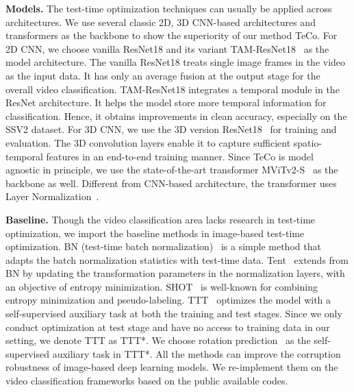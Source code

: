 \documentclass{article} %
\newcommand{\siyuan}[1]{\textcolor[rgb]{0.04, 0.04, 0.98}{\textbf{#1}}}
\begin{document}
\textbf{Models.}
The test-time optimization techniques can usually be applied across architectures. 
We use several classic 2D, 3D CNN-based architectures and transformers as the backbone to show the superiority of our method TeCo. 
For 2D CNN, we choose vanilla ResNet18 and its variant TAM-ResNet18~\citep{fan2019more} as the model architecture. The vanilla ResNet18 treats single image frames in the video as the input data. 
It has only an average fusion at the output stage for the overall video classification. 
TAM-ResNet18 integrates a temporal module in the ResNet architecture. It helps the model store more temporal information for classification. Hence, it obtains improvements in clean accuracy, especially on the SSV2 dataset. 
For 3D CNN, we use the 3D version ResNet18~\citep{hara2017learning} for training and evaluation. The 3D convolution layers enable it to capture sufficient spatio-temporal features in an end-to-end training manner. Since TeCo is model agnostic in principle, we use the state-of-the-art transformer MViTv2-S~\citep{li2022mvitv2} as the backbone as well. Different from CNN-based architecture, the transformer uses Layer Normalization~\citep{ba2016layer}.

\textbf{Baseline.}
Though the video classification area lacks research in test-time optimization, we import the baseline methods in image-based test-time optimization. BN (test-time batch normalization)~\citep{schneider2020improving} is a simple method that adapts the batch normalization statistics with test-time data. Tent~\citep{wang2020tent} extends from BN by updating the transformation parameters in the normalization layers, with an objective of entropy minimization. SHOT~\citep{pmlr-v119-liang20a} is well-known for combining entropy minimization and pseudo-labeling. TTT~\citep{sun2020test} optimizes the model with a self-supervised auxiliary task at both the training and test stages. Since we only conduct optimization at test stage and have no access to training data in our setting, we denote TTT as TTT*. We choose rotation prediction~\citep{hendrycks2019using} as the self-supervised auxiliary task in TTT*. All the methods can improve the corruption robustness of image-based deep learning models. 
We re-implement them on the video classification frameworks based on the public available codes.
\end{document}
